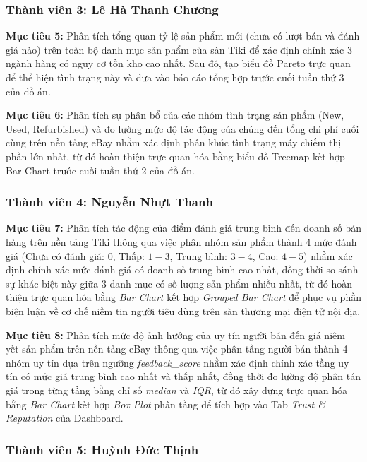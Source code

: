 \subsubsection{Thành viên 3: Lê Hà Thanh Chương}

\textbf{Mục tiêu 5:} Phân tích tổng quan tỷ lệ sản phẩm mới (chưa có lượt bán và đánh giá nào) trên toàn bộ danh mục sản phẩm của sàn Tiki để xác định chính xác 3 ngành hàng có nguy cơ tồn kho cao nhất. Sau đó, tạo biểu đồ Pareto trực quan để thể hiện tình trạng này và đưa vào báo cáo tổng hợp trước cuối tuần thứ 3 của đồ án.

\textbf{Mục tiêu 6:} Phân tích sự phân bổ của các nhóm tình trạng sản phẩm (New, Used, Refurbished) và đo lường mức độ tác động của chúng đến tổng chi phí cuối cùng trên nền tảng eBay nhằm xác định phân khúc tình trạng máy chiếm thị phần lớn nhất, từ đó hoàn thiện trực quan hóa bằng biểu đồ Treemap kết hợp Bar Chart trước cuối tuần thứ 2 của đồ án.

\subsubsection{Thành viên 4: Nguyễn Nhựt Thanh}

\textbf{Mục tiêu 7:} Phân tích tác động của điểm đánh giá trung bình đến doanh số bán hàng trên nền tảng Tiki thông qua việc phân nhóm sản phẩm thành 4 mức đánh giá (Chưa có đánh giá: $0$, Thấp: $1-3$, Trung bình: $3-4$, Cao: $4-5$) nhằm xác định chính xác mức đánh giá có doanh số trung bình cao nhất, đồng thời so sánh sự khác biệt này giữa 3 danh mục có số lượng sản phẩm nhiều nhất, từ đó hoàn thiện trực quan hóa bằng \textit{Bar Chart} kết hợp \textit{Grouped Bar Chart} để phục vụ phần biện luận về cơ chế niềm tin người tiêu dùng trên sàn thương mại điện tử nội địa.

\textbf{Mục tiêu 8:} Phân tích mức độ ảnh hưởng của uy tín người bán đến giá niêm yết sản phẩm trên nền tảng eBay thông qua việc phân tầng người bán thành 4 nhóm uy tín dựa trên ngưỡng \textit{feedback\_score} nhằm xác định chính xác tầng uy tín có mức giá trung bình cao nhất và thấp nhất, đồng thời đo lường độ phân tán giá trong từng tầng bằng chỉ số \textit{median} và \textit{IQR}, từ đó xây dựng trực quan hóa bằng \textit{Bar Chart} kết hợp \textit{Box Plot} phân tầng để tích hợp vào Tab \textit{Trust \& Reputation} của Dashboard.

\subsubsection{Thành viên 5: Huỳnh Đức Thịnh}

